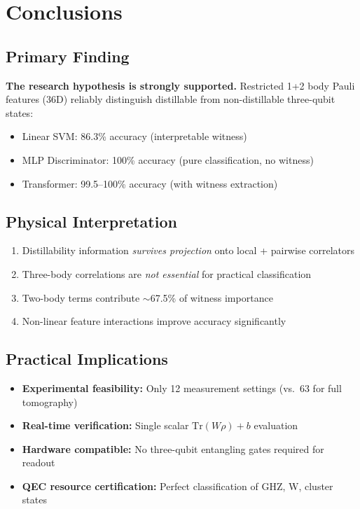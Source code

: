 \documentclass[11pt,a4paper]{article}
\begin{document}
\section{Conclusions}

\subsection{Primary Finding}

\textbf{The research hypothesis is strongly supported.} Restricted 1+2 body Pauli features (36D) reliably distinguish distillable from non-distillable three-qubit states:
\begin{itemize}
    \item Linear SVM: 86.3\% accuracy (interpretable witness)
    \item MLP Discriminator: 100\% accuracy (pure classification, no witness)
    \item Transformer: 99.5--100\% accuracy (with witness extraction)
\end{itemize}

\subsection{Physical Interpretation}

\begin{enumerate}
    \item Distillability information \emph{survives projection} onto local + pairwise correlators
    \item Three-body correlations are \emph{not essential} for practical classification
    \item Two-body terms contribute $\sim$67.5\% of witness importance
    \item Non-linear feature interactions improve accuracy significantly
\end{enumerate}

\subsection{Practical Implications}

\begin{itemize}
    \item \textbf{Experimental feasibility:} Only 12 measurement settings (vs.\ 63 for full tomography)
    \item \textbf{Real-time verification:} Single scalar $\text{Tr}(W\rho) + b$ evaluation
    \item \textbf{Hardware compatible:} No three-qubit entangling gates required for readout
    \item \textbf{QEC resource certification:} Perfect classification of GHZ, W, cluster states
\end{itemize}
\end{document}
